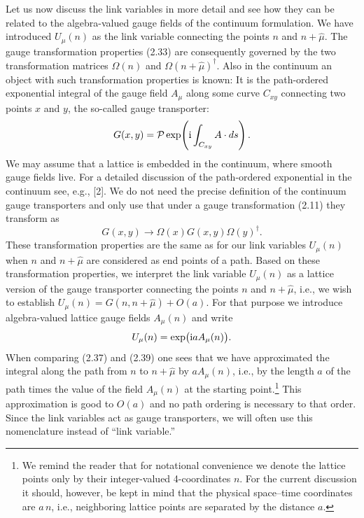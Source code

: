 Let us now discuss the link variables in more detail and see how they can be
related to the algebra-valued gauge fields of the continuum formulation. We
have introduced $U_\mu(n)$ as the link variable connecting the points $n$
and $n + \hat\mu$. The gauge transformation properties (2.33) are
consequently governed by the two transformation matrices $\Omega(n)$ and
$\Omega(n + \hat\mu)^\dagger$. Also in the continuum an object with such
transformation properties is known: It is the path-ordered exponential
integral of the gauge field $A_\mu$ along some curve $C_{xy}$ connecting two
points $x$ and $y$, the so-called gauge transporter:
\begin{equation}
  G(x, y) = \mathcal{P} \exp\!\left( \mathrm{i} \int_{C_{xy}} A \cdot ds \right) .
\end{equation}
We may assume that a lattice is embedded in the continuum, where smooth
gauge fields live. For a detailed discussion of the path-ordered exponential
in the continuum see, e.g., [2]. We do not need the precise definition of
the continuum gauge transporters and only use that under a gauge
transformation (2.11) they transform as
\begin{equation}
  G(x, y) \to \Omega(x) G(x, y) \Omega(y)^\dagger .
\end{equation}
These transformation properties are the same as for our link variables
$U_\mu(n)$ when $n$ and $n + \hat\mu$ are considered as end points of a
path. Based on these transformation properties, we interpret the link
variable $U_\mu(n)$ as a lattice version of the gauge transporter connecting
the points $n$ and $n + \hat\mu$, i.e., we wish to establish
$U_\mu(n) = G(n, n + \hat\mu) + O(a)$. For that purpose we introduce
algebra-valued lattice gauge fields $A_\mu(n)$ and write
\begin{equation}
  U_\mu(n) = \exp\!\big(\mathrm{i} a A_\mu(n)\big) .
\end{equation}
When comparing (2.37) and (2.39) one sees that we have approximated the
integral along the path from $n$ to $n + \hat\mu$ by $aA_\mu(n)$, i.e., by
the length $a$ of the path times the value of the field $A_\mu(n)$ at the
starting point.\footnote{We remind the reader that for notational
convenience we denote the lattice points only by their integer-valued
4-coordinates $n$. For the current discussion it should, however, be kept in
mind that the physical space--time coordinates are $a\,n$, i.e., neighboring
lattice points are separated by the distance $a$.} This approximation is
good to $O(a)$ and no path ordering is necessary to that order. Since the
link variables act as gauge transporters, we will often use this
nomenclature instead of ``link variable.''

